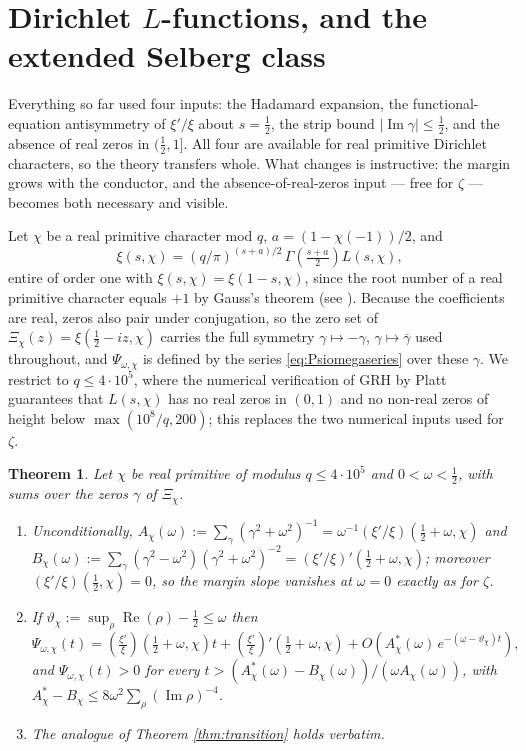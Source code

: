 \documentclass[11pt,reqno]{amsart}
\theoremstyle{plain}
\newtheorem{theorem}{Theorem}[section]
\theoremstyle{definition}
\newcommand{\Rp}{\operatorname{Re}}
\newcommand{\Ip}{\operatorname{Im}}
\newcommand{\lxi}[1]{\left(\tfrac{\xi'}{\xi}\right)\!#1}
\begin{document}
\section{Dirichlet $L$-functions, and the extended Selberg class}\label{sec:dirichlet}

Everything so far used four inputs: the Hadamard expansion, the functional-equation antisymmetry
of $\xi'/\xi$ about $s=\tfrac12$, the strip bound $|\Ip\gamma|\le\tfrac12$, and the absence of
real zeros in $(\tfrac12,1]$. All four are available for real primitive Dirichlet characters, so
the theory transfers whole. What changes is instructive: the margin grows with the conductor, and
the absence-of-real-zeros input --- free for $\zeta$ --- becomes both necessary and visible.

Let $\chi$ be a real primitive character mod $q$, $a=(1-\chi(-1))/2$, and
\[
  \xi(s,\chi)=(q/\pi)^{(s+a)/2}\,\Gamma\!\left(\tfrac{s+a}2\right)L(s,\chi),
\]
entire of order one with $\xi(s,\chi)=\xi(1-s,\chi)$, since the root number of a real primitive
character equals $+1$ by Gauss's theorem (see \cite[\S9]{Davenport}). Because the coefficients are
real, zeros also pair under conjugation, so the zero set of $\Xi_\chi(z)=\xi(\tfrac12-iz,\chi)$
carries the full symmetry $\gamma\mapsto-\gamma$, $\gamma\mapsto\overline\gamma$ used throughout,
and $\Psi_{\omega,\chi}$ is defined by the series \eqref{eq:Psiomegaseries} over these $\gamma$.
We restrict to $q\le4\cdot10^{5}$, where the numerical verification of GRH by Platt
\cite{Platt2016} guarantees that $L(s,\chi)$ has no real zeros in $(0,1)$ and no non-real zeros of
height below $\max(10^{8}/q,200)$; this replaces the two numerical inputs used for $\zeta$.

\begin{theorem}\label{thm:chi}
Let $\chi$ be real primitive of modulus $q\le4\cdot10^{5}$ and $0<\omega<\tfrac12$, with sums over
the zeros $\gamma$ of $\Xi_\chi$.
\begin{enumerate}
\item[(i)] Unconditionally,
$A_\chi(\omega):=\sum_\gamma(\gamma^{2}+\omega^{2})^{-1}
 =\omega^{-1}(\xi'/\xi)(\tfrac12+\omega,\chi)$ and
$B_\chi(\omega):=\sum_\gamma(\gamma^{2}-\omega^{2})(\gamma^{2}+\omega^{2})^{-2}
 =(\xi'/\xi)'(\tfrac12+\omega,\chi)$; moreover $(\xi'/\xi)(\tfrac12,\chi)=0$, so the margin slope
vanishes at $\omega=0$ exactly as for $\zeta$.
\item[(ii)] If $\vartheta_\chi:=\sup_\rho\Rp(\rho)-\tfrac12\le\omega$ then
\[
  \Psi_{\omega,\chi}(t)=\lxi{\left(\tfrac12+\omega,\chi\right)}t
  +\lxi{'\left(\tfrac12+\omega,\chi\right)}
  +O\!\left(A^{*}_\chi(\omega)\,e^{-(\omega-\vartheta_\chi)t}\right),
\]
and $\Psi_{\omega,\chi}(t)>0$ for every
$t>(A^{*}_\chi(\omega)-B_\chi(\omega))/(\omega A_\chi(\omega))$, with
$A^{*}_\chi-B_\chi\le8\omega^{2}\sum_\rho(\Ip\rho)^{-4}$.
\item[(iii)] The analogue of Theorem \ref{thm:transition} holds verbatim.
\end{enumerate}
\end{theorem}
\end{document}
